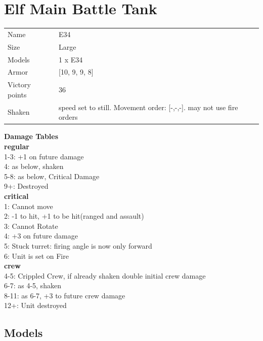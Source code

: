  















\clearpage

\section{ Elf Main Battle Tank }

\begin{tabular}{ll}
  Name & E34 \\
  Size & Large\\
  Models & 1 x E34\\
  Armor & [10, 9, 9, 8]\\
  Victory points & 36\\
  Shaken & speed set to still. Movement order: [-,-,-]. may not use fire orders\\
\end{tabular}




{\bf Damage Tables} \\
 {\bf regular } \\
1-3: +1 on future damage \\
4: as below, shaken \\
5-8: as below, Critical Damage \\
9+: Destroyed \\
 {\bf critical } \\
1: Cannot move \\
2: -1 to hit, +1 to be hit(ranged and assault) \\
3: Cannot Rotate \\
4: +3 on future damage \\
5: Stuck turret: firing angle is now only forward \\
6: Unit is set on Fire \\
 {\bf crew } \\
4-5: Crippled Crew, if already shaken double initial crew damage \\
6-7: as 4-5, shaken \\
8-11: as 6-7, +3 to future crew damage \\
12+: Unit destroyed \\


\clearpage

\subsection{ Models }

